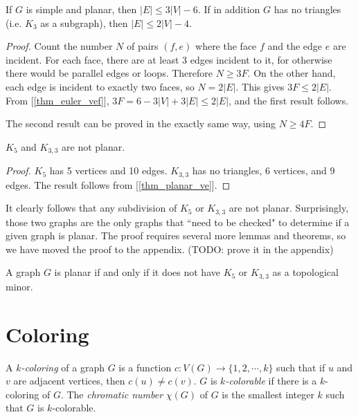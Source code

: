         \begin{thm} \label{thm_planar_ve}
            If $G$ is simple and planar, then $|E| \leq 3|V|-6$. If in addition $G$ has no triangles (i.e. $K_3$ as a subgraph), then $|E| \leq 2|V|-4$.
        \end{thm}
        
        \begin{proof}
            Count the number $N$ of pairs $(f, e)$ where the face $f$ and the edge $e$ are incident. For each face, there are at least 3 edges incident to it, for otherwise there would be parallel edges or loops. Therefore $N \geq 3F$. On the other hand, each edge is incident to exactly two faces, so $N = 2|E|$. This gives $3F \leq 2|E|$. From [\ref{thm_euler_vef}], $3F = 6-3|V|+3|E| \leq 2|E|$, and the first result follows.
            
            The second result can be proved in the exactly same way, using $N \geq 4F$.
        \end{proof}
        
        \begin{coro} \label{cor_k5_k33}
            $K_5$ and $K_{3,3}$ are not planar.
        \end{coro}
        
        \begin{proof}
            $K_5$ has 5 vertices and 10 edges. $K_{3,3}$ has no triangles, 6 vertices, and 9 edges. The result follows from [\ref{thm_planar_ve}].
        \end{proof}
        
        It clearly follows that any subdivision of $K_5$ or $K_{3,3}$ are not planar. Surprisingly, those two graphs are the only graphs that ``need to be checked" to determine if a given graph is planar. The proof requires several more lemmas and theorems, so we have moved the proof to the appendix. (TODO: prove it in the appendix)
        
        \begin{thm} \label{thm_kuratowski}
            A graph $G$ is planar if and only if it does not have $K_5$ or $K_{3,3}$ as a topological minor.
        \end{thm}
    
    \section{Coloring}
        \begin{defn}[Coloring] \label{def_coloring}
            A \emph{$k$-coloring} of a graph $G$ is a function $c: V(G) \rightarrow \{1,2,\cdots,k\}$ such that if $u$ and $v$ are adjacent vertices, then $c(u) \neq c(v)$. $G$ is \emph{$k$-colorable} if there is a $k$-coloring of $G$. The \emph{chromatic number} $\chi(G)$ of $G$ is the smallest integer $k$ such that $G$ is $k$-colorable.
        \end{defn}
        
